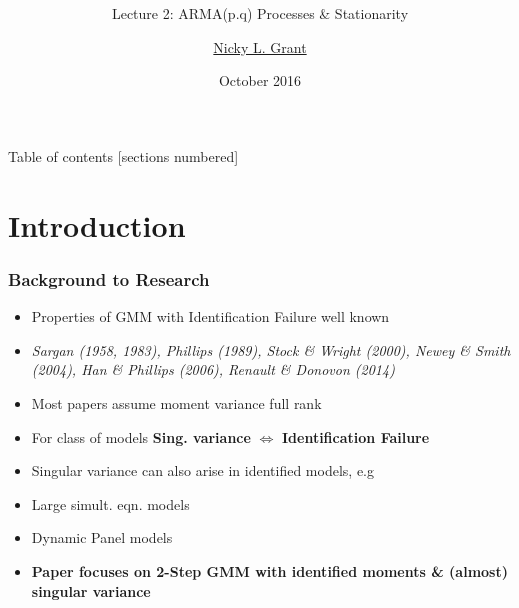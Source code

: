 \documentclass{beamer}
\title{	\HUGE{ ECON30401: Time Series Econometrics}}\subtitle{\vspace{1cm}\LARGE Lecture 2: ARMA(p.q) Processes \& Stationarity}
\date{\large October 2016}
\author{
			\href{mailto:nicky.grant@manchester.ac.uk}{\large Nicky L.  Grant}}
\begin{document}
			\begin{center}\maketitle \end{center}
			 \small
			\begin{frame}{Table of contents}
				[sections numbered]
				\tableofcontents[hideallsubsections]
			\end{frame}

\section{Introduction}
\begin{frame}
\frametitle{Background to Research}
\begin{itemize}

\item Properties of GMM with Identification Failure well known
\item[] \textit{Sargan (1958, 1983), Phillips (1989), Stock \& Wright (2000), Newey \& Smith (2004), Han \& Phillips (2006), Renault \& Donovon (2014)}
\vspace{10pt}

\item[] Most papers assume moment variance full rank
\vspace{10pt}

\item[] For class of models\textbf{ Sing.  variance} $\Leftrightarrow$ \textbf{ Identification Failure}
\vspace{10pt}
 \item Singular variance can also arise in identified models, e.g
 \item[] \hspace{1cm} Large simult. eqn. models
 \item[] \hspace{1cm} Dynamic Panel models
 \vspace{10pt}
\item[] \textbf{Paper focuses on 2-Step GMM with identified moments \& (almost) singular variance }
\end{itemize}
\end{frame}
\end{document}
